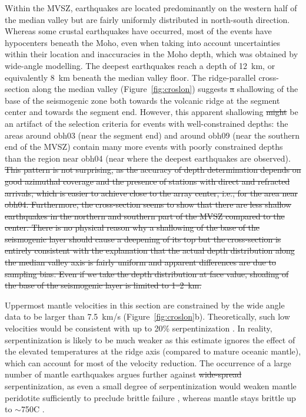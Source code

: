 \documentclass[jgrga]{agu2001} %
\providecommand{\DIFadd}[1]{{\protect\color{blue}\uwave{#1}}} %
\providecommand{\DIFdel}[1]{{\protect\color{red}\sout{#1}}}                      %
\providecommand{\DIFaddbegin}{} %
\providecommand{\DIFaddend}{} %
\providecommand{\DIFdelbegin}{} %
\providecommand{\DIFdelend}{} %
\begin{document}
\begin{article}
Within the MVSZ, earthquakes are located predominantly on the western half of the median valley but are
fairly uniformly distributed in north-south direction.  Whereas some
crustal earthquakes have occurred, most of the events have hypocenters
beneath the Moho, even when taking into account uncertainties within
their location and inaccuracies in the Moho depth, which was obtained
by wide-angle modelling.  The deepest earthquakes reach a depth of 
12~km, or equivalently 8~km beneath the median valley floor. The ridge-parallel cross-section
along the median valley (Figure~\ref{fig:croslon}) suggests \DIFdelbegin \DIFdel{a
}\DIFdelend \DIFaddbegin \DIFadd{an apparent
}\DIFaddend shallowing of the base of the seismogenic zone both towards the
volcanic ridge at the segment center and towards the segment end.
However, this apparent shallowing \DIFdelbegin \DIFdel{might }\DIFdelend \DIFaddbegin \DIFadd{is likely to }\DIFaddend be an artifact of the
selection criteria for events with well-constrained depths: the areas
around obh03 (near the segment end) and around obh09 (near
the southern end of the MVSZ) contain many more
events with poorly constrained depths than the region
near obh04 (near where the deepest earthquakes are observed).  
 \DIFdelbegin \DIFdel{This
pattern is not surprising, as the accuracy of depth determination
depends on good azimuthal coverage and the presence of stations with
direct and refracted arrivals, which is easier to achieve close to the
array center, i.e., for the area near obh04.  Furthermore, the cross-section seems to show that there are less
shallow earthquakes in the northern  and
southern part of the MVSZ compared to the center.  There is no physical reason why a shallowing of
the base of the seismogenic layer should cause a deepening of 
its top but the cross-section is entirely consistent with
the explanation that the actual depth distribution along the median
valley axis is fairly uniform and apparent differences are due to
sampling bias. Even if we take the depth distribution at face value,
shoaling of the base of the seismogenic layer is limited to 1--2~km.
 }\DIFdelend 


Uppermost mantle velocities in this section are constrained by the
 wide angle data to be larger than 7.5~km/s
(Figure~\ref{fig:croslon}b). Theoretically, such low velocities would be
consistent with up to 20\% serpentinization
\citep{oreilly96,christensen66}.  In reality, serpentinization is
likely to be much weaker as this estimate ignores the
effect of the elevated temperatures at the ridge axis (compared to
mature oceanic mantle), which can account for most of the velocity
reduction. The occurrence of a large number of mantle earthquakes
argues further against \DIFdelbegin \DIFdel{wide-spread }\DIFdelend \DIFaddbegin \DIFadd{widespread }\DIFaddend serpentinization, as even a small
degree of serpentinization would weaken mantle peridotite sufficiently
to preclude brittle failure \citep{escartin97a}, whereas mantle stays brittle up to
$\sim$750\dg C \citep{wiens83}.


\end{article}
\end{document}
